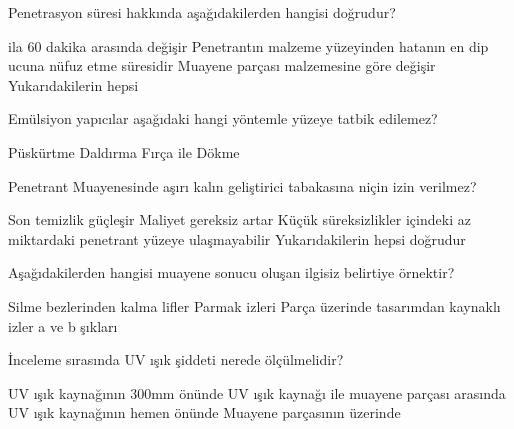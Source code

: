 \begin{question}[subtitle=]
  Penetrasyon süresi hakkında aşağıdakilerden hangisi doğrudur?
  \begin{tasks}
     ila 60 dakika arasında değişir
    \task Penetrantın malzeme yüzeyinden hatanın en dip ucuna nüfuz etme süresidir
    \task Muayene parçası malzemesine göre değişir \correct
    \task Yukarıdakilerin hepsi 
  \end{tasks}
\end{question}
\begin{solution}
	\correct
\end{solution}

\begin{question}[subtitle=]
  Emülsiyon yapıcılar aşağıdaki hangi yöntemle yüzeye tatbik edilemez?
  \begin{tasks}
    \task Püskürtme
    \task Daldırma
    \task Fırça ile \correct
    \task Dökme
  \end{tasks}
\end{question}
\begin{solution}
	\correct
\end{solution}

\begin{question}[subtitle=]
  Penetrant Muayenesinde aşırı kalın geliştirici tabakasına niçin izin verilmez?
  \begin{tasks}
    \task Son temizlik güçleşir 
    \task Maliyet gereksiz artar
    \task Küçük süreksizlikler içindeki az miktardaki penetrant yüzeye ulaşmayabilir
    \task Yukarıdakilerin hepsi doğrudur \correct
  \end{tasks}
\end{question}
\begin{solution}
	\correct
\end{solution}

\begin{question}[subtitle=]
  Aşağıdakilerden hangisi muayene sonucu oluşan ilgisiz belirtiye örnektir?
  \begin{tasks}
    \task Silme bezlerinden kalma lifler
    \task Parmak izleri
    \task Parça üzerinde tasarımdan kaynaklı izler \correct
    \task a ve b şıkları
  \end{tasks}
\end{question}
\begin{solution}
	\correct
\end{solution}

\begin{question}[subtitle=]
  İnceleme sırasında UV ışık şiddeti nerede ölçülmelidir?
  \begin{tasks}
    \task UV ışık kaynağının 300mm önünde
    \task UV ışık kaynağı ile muayene parçası arasında
    \task UV ışık kaynağının hemen önünde
    \task Muayene parçasının üzerinde \correct
  \end{tasks}
\end{question}
\begin{solution}
	\correct
\end{solution}




